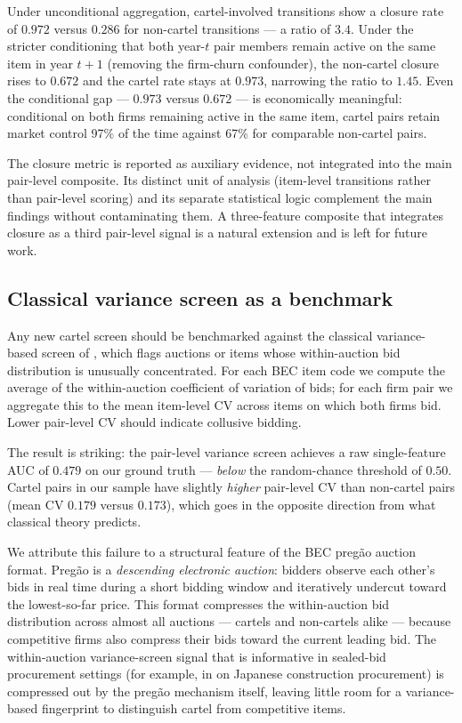 Under unconditional aggregation, cartel-involved transitions show a closure rate of $0.972$ versus $0.286$ for non-cartel transitions --- a ratio of $3.4$. Under the stricter conditioning that both year-$t$ pair members remain active on the same item in year $t+1$ (removing the firm-churn confounder), the non-cartel closure rises to $0.672$ and the cartel rate stays at $0.973$, narrowing the ratio to $1.45$. Even the conditional gap --- $0.973$ versus $0.672$ --- is economically meaningful: conditional on both firms remaining active in the same item, cartel pairs retain market control 97\% of the time against 67\% for comparable non-cartel pairs.

The closure metric is reported as auxiliary evidence, not integrated into the main pair-level composite. Its distinct unit of analysis (item-level transitions rather than pair-level scoring) and its separate statistical logic complement the main findings without contaminating them. A three-feature composite that integrates closure as a third pair-level signal is a natural extension and is left for future work.

\subsection{Classical variance screen as a benchmark}\label{sec:rob_variance}

Any new cartel screen should be benchmarked against the classical variance-based screen of \citet{abrantesmetz2006screening}, which flags auctions or items whose within-auction bid distribution is unusually concentrated. For each BEC item code we compute the average of the within-auction coefficient of variation of bids; for each firm pair we aggregate this to the mean item-level CV across items on which both firms bid. Lower pair-level CV should indicate collusive bidding.

The result is striking: the pair-level variance screen achieves a raw single-feature AUC of $0.479$ on our ground truth --- \emph{below} the random-chance threshold of $0.50$. Cartel pairs in our sample have slightly \emph{higher} pair-level CV than non-cartel pairs (mean CV $0.179$ versus $0.173$), which goes in the opposite direction from what classical theory predicts.

We attribute this failure to a structural feature of the BEC preg\~{a}o auction format. Preg\~{a}o is a \emph{descending electronic auction}: bidders observe each other's bids in real time during a short bidding window and iteratively undercut toward the lowest-so-far price. This format compresses the within-auction bid distribution across almost all auctions --- cartels and non-cartels alike --- because competitive firms also compress their bids toward the current leading bid. The within-auction variance-screen signal that is informative in sealed-bid procurement settings (for example, in \citet{kawai2022detecting} on Japanese construction procurement) is compressed out by the preg\~{a}o mechanism itself, leaving little room for a variance-based fingerprint to distinguish cartel from competitive items.

